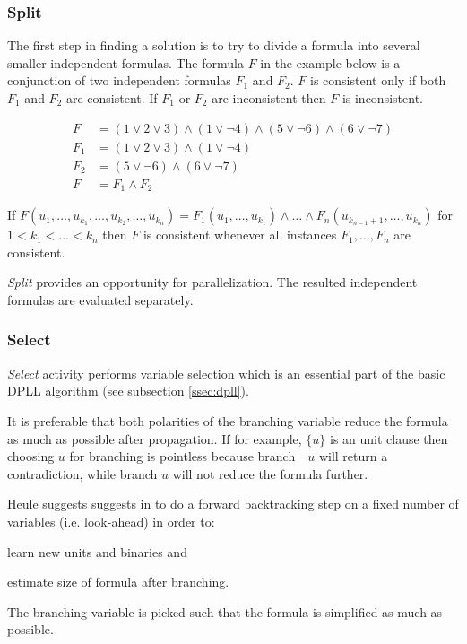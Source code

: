 \subsubsection{Split}
\label{sssec:split}

The first step in finding a solution is to try to divide a formula
into several smaller independent formulas.  The formula $F$ in
the example below is a conjunction of two independent formulas
$F_1$ and $F_2$. $F$ is consistent only if both $F_1$ and $F_2$
are consistent. If $F_1$ or $F_2$ are inconsistent then $F$
is inconsistent.

\begin{align}
  F &= (1 \lor 2 \lor 3) \land (1 \lor \neg 4) \land (5 \lor \neg 6) \land (6 \lor \neg 7) \\
  F_1 &= (1 \lor 2 \lor 3) \land (1 \lor \neg 4) \\
  F_2 &= (5 \lor \neg 6) \land (6 \lor \neg 7) \\
  F &= F_1 \land F_2
\end{align}

\begin{myprop}
  If $F(u_1, \ldots, u_{k_1}, \ldots, u_{k_2}, \ldots, u_{k_n}) =
  F_1(u_1, \ldots, u_{k_1}) \land \ldots \land F_n(u_{k_{n-1}+1},
  \ldots, u_{k_n})$ for $1 < k_1 < \ldots <k_n$ then $F$
  is consistent whenever all instances $F_1, \ldots, F_n$
  are consistent.
\end{myprop}

\emph{Split} provides an opportunity for parallelization. The
resulted independent formulas are evaluated separately.


\subsubsection{Select}
\label{ssec:branching}

\emph{Select} activity performs variable selection which
is an essential part of the basic DPLL algorithm (see subsection
\ref{ssec:dpll}).

It is preferable that both polarities of the branching variable
reduce the formula as much as possible after propagation.  If for
example, $\{ u \}$ is an unit clause then choosing $u$ for branching
is pointless because branch $\neg u$ will return a contradiction,
while branch $u$ will not reduce the formula further.

Heule suggests suggests in \cite{mine:march} to do a forward
backtracking step on a fixed number of variables (i.e. look-ahead)
in order to:
\begin{inparaenum}[a)]
  \item learn new units and binaries and
  \item estimate size of formula after branching.
\end{inparaenum} The branching variable is picked such that
the formula is simplified as much as possible.

